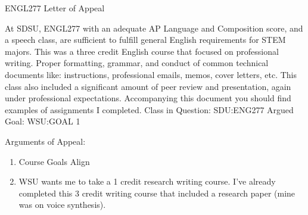 \documentclass{article}
\begin{document}
\begin{center}
	ENGL277 Letter of Appeal
\end{center}

At SDSU, ENGL277 with an adequate AP Language and Composition score, and a speech class, are sufficient to fulfill general English requirements for STEM majors. This was a three credit English course that focused on professional writing. Proper formatting, grammar, and conduct of common technical documents like: instructions, professional emails, memos, cover letters, etc. This class also included a significant amount of peer review and presentation, again under professional expectations. Accompanying this document you should find examples of assignments I completed.
\newline
Class in Question: SDU:ENG277
\newline
Argued Goal: WSU:GOAL 1

Arguments of Appeal:
\begin{enumerate}
	\item Course Goals Align
	\item WSU wants me to take a 1 credit research writing course. I've already completed this 3 credit writing course that included a research paper (mine was on voice synthesis).
\end{enumerate}

\end{document}

